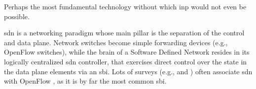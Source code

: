 Perhaps the most fundamental technology without which \gls{inp} would not even be possible.

\gls{sdn} is a networking paradigm whose main pillar is the separation of the control and data plane.
Network switches become simple forwarding devices (e.g., OpenFlow \cite{openflow} switches), while the brain of a Software Defined Network resides in its logically centralized \gls{sdn} controller, that exercises direct control over the state in the data plane elements via an \gls{sbi}.
Lots of surveys (e.g., \cite{kreutz2014software} and \cite{kim2013improving}) often associate \gls{sdn} with OpenFlow \cite{openflow}, as it is by far the most common \gls{sbi}.